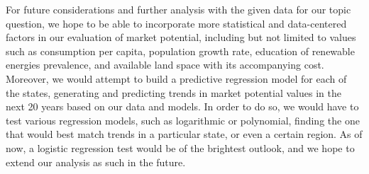 \documentclass[12pt]{article}
\begin{document}
For future considerations and further analysis with the given data for our topic question, we hope to be able to incorporate more statistical and data-centered factors in our evaluation of market potential, including but not limited to values such as consumption per capita, population growth rate, education of renewable energies prevalence, and available land space with its accompanying cost. Moreover, we would attempt to build a predictive regression model for each of the states, generating and predicting trends in market potential values in the next 20 years based on our data and models. In order to do so, we would have to test various regression models, such as logarithmic or polynomial, finding the one that would best match trends in a particular state, or even a certain region. As of now, a logistic regression test would be of the brightest outlook, and we hope to extend our analysis as such in the future.
\end{document}

